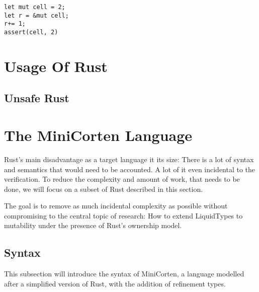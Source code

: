 \documentclass{article}
\theoremstyle{definition}
\begin{document}
\label{lst:alias-mut}\begin{lstlisting}
let mut cell = 2;
let r = &mut cell;
r+= 1;
assert(cell, 2)
\end{lstlisting}

\section{Usage Of Rust}

\label{ss:unsafe-rust}\subsection{Unsafe Rust}

\section{The MiniCorten Language}

Rust's main disadvantage as a target language it its size: There is a lot of syntax and semantics that would need to be accounted. A lot of it even incidental to the verification. To reduce the complexity and amount of work, that needs to be done, we will focus on a subset of Rust described in this section.

The goal is to remove as much incidental complexity as possible without compromising to the central topic of research: How to extend LiquidTypes to mutability under the presence of Rust's ownership model.

\subsection{Syntax}

This subsection will introduce the syntax of MiniCorten, a language modelled after a simplified version of Rust, with the addition of refinement types.
\end{document}
